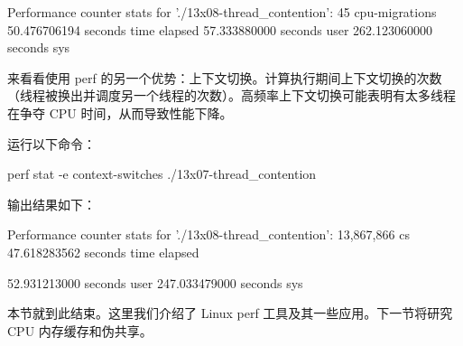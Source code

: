 \begin{shell}
Performance counter stats for './13x08-thread_contention':
            45         cpu-migrations
  50.476706194     seconds time elapsed
  57.333880000 seconds user
 262.123060000 seconds sys
\end{shell}

来看看使用 perf 的另一个优势：上下文切换。计算执行期间上下文切换的次数（线程被换出并调度另一个线程的次数）。高频率上下文切换可能表明有太多线程在争夺 CPU 时间，从而导致性能下降。

运行以下命令：

\begin{shell}
perf stat -e context-switches ./13x07-thread_contention
\end{shell}

输出结果如下：

\begin{shell}
Performance counter stats for './13x08-thread_contention':
     13,867,866     cs
   47.618283562 seconds time elapsed

   52.931213000 seconds user
  247.033479000 seconds sys
\end{shell}

本节就到此结束。这里我们介绍了 Linux perf 工具及其一些应用。下一节将研究 CPU 内存缓存和伪共享。
















